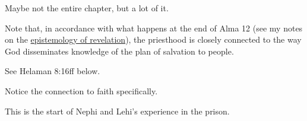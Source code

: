 \begin{compactdesc}
				\begin{compactitem}
					\item Maybe not the entire chapter, but a lot of it.
					\item Note that, in accordance with what happens at the end of Alma 12 (see my notes on the \hyperref[EPIST-REVELATION-BOM]{epistemology of revelation}), the priesthood is closely connected to the way God disseminates knowledge of the plan of salvation to people.
					\item See Helaman 8:16ff below.
				\end{compactitem}
			\item[{\hyperref[ALMA-14-25]{Alma 14:25--29}}] \phantom{.}
				\begin{compactitem}
					\item Notice the connection to faith specifically.
				\end{compactitem}
			\item[{\hyperref[ALMA-29-13]{Alma 29:13}}]
			\item[{\hyperref[ALMA-39-15]{Alma 39:15--19}}]
			\item[{\hyperref[ALMA-43-2]{Alma 43:2}}]
			\item[{\hyperref[HELAMAN-5-11]{Helaman 5:11--12}}]
			\item[{\hyperref[HELAMAN-5-18]{Helaman 5:18}}]
			\item[{\hyperref[HELAMAN-5-23]{Helaman 5:23}}] \phantom{.}
				\begin{compactitem}
					\item This is the start of Nephi and Lehi's experience in the prison.
				\end{compactitem}
			\item[{\hyperref[HELAMAN-8-16]{Helaman 8:16}}]
			\item[{\hyperref[HELAMAN-10-1]{Helaman 10:1--11}}]
			\item[{\hyperref[HELAMAN-10-15]{Helaman 10:15--17}}]
			\item[{\hyperref[3NEPHI-5-13]{3 Nephi 5:13}}]
			\item[{\hyperref[3NEPHI-8-1]{3 Nephi 8:1}}]
			\item[{\hyperref[3NEPHI-9-15]{3 Nephi 9:15}}]
			\item[{\hyperref[3NEPHI-11-21]{3 Nephi 11:21--28}}]
			\item[{\hyperref[3NEPHI-12-1]{3 Nephi 12:1}}]
			\item[{\hyperref[3NEPHI-15-9]{3 Nephi 15:9--10}}]
			\item[{\hyperref[3NEPHI-18-36]{3 Nephi 18:36--38}}]

\end{compactdesc}
